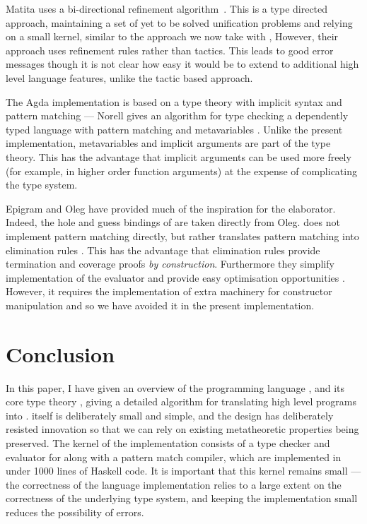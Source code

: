 Matita uses a bi-directional refinement algorithm~\cite{Asperti}. This is a
type directed approach, maintaining a set of yet to be solved unification
problems and relying on a small kernel, similar to the approach we now take
with \Idris{}, However, their approach uses refinement rules rather than
tactics. This leads to good error messages though it is not clear how
easy it would be to extend to additional high level language features, unlike
the tactic based approach.

The Agda implementation is based on a type theory with
implicit syntax and pattern matching --- Norell gives an algorithm for type checking
a dependently typed language with pattern matching and metavariables 
\cite{norell2007thesis}. Unlike the present \Idris{} implementation, metavariables
and implicit arguments are part of the type theory. This has the advantage that
implicit arguments can be used more freely (for example, in higher order
function arguments) at the expense of complicating the type system.

Epigram \cite{McBride2004a} and Oleg \cite{McBride1999} 
have provided much of the inspiration for the \Idris{} elaborator. Indeed,
the hole and guess bindings of \TTdev{} are taken directly from Oleg.
\Epigram{} does not implement pattern matching directly, but rather translates
pattern matching into elimination rules \cite{McBride2002}. This has the
advantage that
elimination rules provide termination and coverage proofs \emph{by construction}.
Furthermore they simplify implementation of the evaluator and provide easy
optimisation opportunities \cite{Brady2003}. However, it requires the
implementation of extra machinery for constructor manipulation
\cite{McBride2006} and so we have avoided it in the present implementation.




\section{Conclusion}

\label{sect:conclusion}

In this paper, I have given an overview of the programming language \Idris{},
and its core type theory \TT{}, giving a detailed algorithm for translating
high level programs into \TT{}.
\TT{} itself is deliberately small and simple, and the design has deliberately
resisted innovation so that we can rely on existing metatheoretic properties
being preserved. The kernel of the \Idris{} implementation consists of a type checker
and evaluator for \TT{} along with a pattern match compiler, which are implemented
in under 1000 lines of Haskell code. It is important that this kernel remains small
--- the correctness of the language implementation relies to a large extent on
the correctness of the underlying type system, and keeping the implementation small
reduces the possibility of errors.

